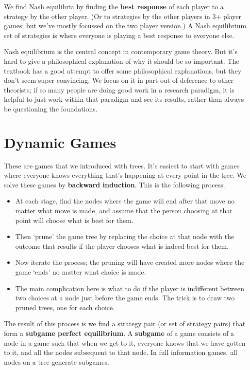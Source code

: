 We find Nash equilibria by finding the \textbf{best response} of each player to a strategy by the other player. (Or to strategies by the other players in 3+ player games; but we've mostly focussed on the two player version.) A Nash equilibrium set of strategies is where everyone is playing a best response to everyone else.

Nash equilibrium is the central concept in contemporary game theory. But it's hard to give a philosophical explanation of why it should be so important. The textbook has a good attempt to offer some philosophical explanations, but they don't seem super convincing. We focus on it in part out of deference to other theorists; if so many people are doing good work in a research paradigm, it is helpful to just work within that paradigm and see its results, rather than always be questioning the foundations.

\section{Dynamic Games}
\label{dynamicgames}

These are games that we introduced with trees. It's easiest to start with games where everyone knows everything that's happening at every point in the tree. We solve these games by \textbf{backward induction}. This is the following process.

\begin{itemize}
\item{} At each stage, find the nodes where the game will end after that move no matter what move is made, and assume that the person choosing at that point will choose what is best for them.

\item{} Then `prune' the game tree by replacing the choice at that node with the outcome that results if the player chooses what is indeed best for them.

\item{} Now iterate the process; the pruning will have created more nodes where the game `ends' no matter what choice is made.

\item{} The main complication here is what to do if the player is indifferent between two choices at a node just before the game ends. The trick is to draw two pruned trees, one for each choice.

\end{itemize}

The result of this process is we find a strategy pair (or set of strategy pairs) that form a \textbf{subgame perfect equilibrium}. A \textbf{subgame} of a game consists of a node in a game such that when we get to it, everyone knows that we have gotten to it, and all the nodes subsequent to that node. In full information games, all nodes on a tree generate subgames.

